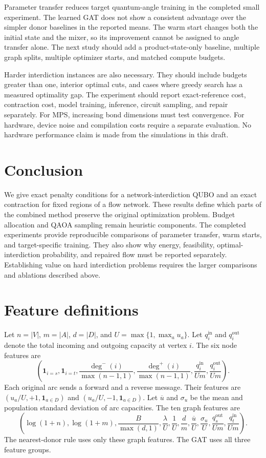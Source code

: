 \documentclass[review,onefignum,onetabnum]{siamart171218}
\begin{document}
Parameter transfer reduces target quantum-angle training in the completed small experiment.
The learned GAT does not show a consistent advantage over the simpler donor baselines in the reported means.
The warm start changes both the initial state and the mixer, so its improvement cannot be assigned to angle transfer alone.
The next study should add a product-state-only baseline, multiple graph splits, multiple optimizer starts, and matched compute budgets.

Harder interdiction instances are also necessary.
They should include budgets greater than one, interior optimal cuts, and cases where greedy search has a measured optimality gap.
The experiment should report exact-reference cost, contraction cost, model training, inference, circuit sampling, and repair separately.
For MPS, increasing bond dimensions must test convergence.
For hardware, device noise and compilation costs require a separate evaluation.
No hardware performance claim is made from the simulations in this draft.

\section{Conclusion}
We give exact penalty conditions for a network-interdiction QUBO and an exact contraction for fixed regions of a flow network.
These results define which parts of the combined method preserve the original optimization problem.
Budget allocation and QAOA sampling remain heuristic components.
The completed experiments provide reproducible comparisons of parameter transfer, warm starts, and target-specific training.
They also show why energy, feasibility, optimal-interdiction probability, and repaired flow must be reported separately.
Establishing value on hard interdiction problems requires the larger comparisons and ablations described above.

\appendix
\section{Feature definitions}\label{sec:features}
Let $n=|V|$, $m=|A|$, $d=|D|$, and $U=\max\{1,\max_a u_a\}$.
Let $q_i^{\mathrm{in}}$ and $q_i^{\mathrm{out}}$ denote the total incoming and outgoing capacity at vertex $i$.
The six node features are
\[
 \left(\mathbf{1}_{i=s},\mathbf{1}_{i=t},
 \frac{\deg^-(i)}{\max(n-1,1)},\frac{\deg^+(i)}{\max(n-1,1)},
 \frac{q_i^{\mathrm{in}}}{Um},\frac{q_i^{\mathrm{out}}}{Um}\right).
\]
Each original arc sends a forward and a reverse message.
Their features are $(u_a/U,+1,\mathbf{1}_{a\in D})$ and $(u_a/U,-1,\mathbf{1}_{a\in D})$.
Let $\overline u$ and $\sigma_u$ be the mean and population standard deviation of arc capacities.
The ten graph features are
\[
 \left(\log(1+n),\log(1+m),\frac{B}{\max(d,1)},
 \frac{\lambda}{U},\frac{1}{U},\frac{d}{m},
 \frac{\overline u}{U},\frac{\sigma_u}{U},
 \frac{q_s^{\mathrm{out}}}{Um},\frac{q_t^{\mathrm{in}}}{Um}\right).
\]
The nearest-donor rule uses only these graph features.
The GAT uses all three feature groups.
\end{document}
